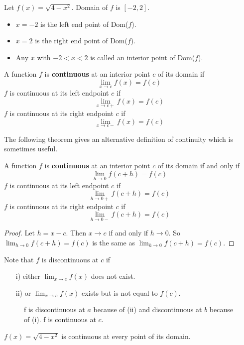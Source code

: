 \documentclass[../main.tex]{subfiles}
\begin{document}
	Let $f(x) = \sqrt{4 - x^2}$. Domain of $f$ is $[-2, 2]$.
	\begin{itemize}
		\item $x = -2$ is the left end point of Dom($f$).
		\item $x = 2$ is the right end point of Dom($f$).
		\item Any $x$ with $-2 < x < 2$ is called an interior point of Dom($f$).
	\end{itemize}

	\begin{definition}
		A function $f$ is \textbf{continuous} at an interior point $c$ of its domain if
		\[
			\lim_{x \to c} f(x) = f(c)
		\]
		$f$ is continuous at its left endpoint $c$ if
		\[
			\lim_{x \to c+} f(x) = f(c)
		\]
		$f$ is continuous at its right endpoint $c$ if
		\[
			\lim_{x \to c-} f(x) = f(c)
		\]
	\end{definition}

	The following theorem gives an alternative definition of continuity which is sometimes useful.
	\begin{theorem}\label{alternative continuity}
	A function $f$ is \textbf{continuous} at an interior point $c$ of its domain if and only if
	\[
		\lim_{h \to 0} f(c+h) = f(c)
	\]
	$f$ is continuous at its left endpoint $c$ if
	\[
		\lim_{h \to 0+} f(c+h) = f(c)
	\]
	$f$ is continuous at its right endpoint $c$ if
	\[
		\lim_{h \to 0-} f(c+h) = f(c)
	\]
\end{theorem}
\begin{proof}
	Let $h=x-c$. Then $x \to c$ if and only if $h \to 0$. So $\lim_{h \to 0} f(c+h) = f(c)$ is the same as $\lim_{h \to 0} f(c+h) = f(c)$.
\end{proof}
Note that $f$ is discontinuous at $c$ if
\begin{itemize}
	\item[i)] either $\lim_{x \to c} f(x)$ does not exist.
	\item[ii)] or $\lim_{x \to c} f(x)$ exists but is not equal to $f(c)$.
\end{itemize}

\begin{figure}[H]
	\centering
	
	\caption{f is discontinuous at $a$ because of (ii) and discontinuous at $b$ because of (i). f is continuous at $c$.}
\end{figure}

\begin{example}
	$f(x) = \sqrt{4 - x^2}$ is continuous at every point of its domain.
	\begin{figure}[H]
		\centering
		
	\end{figure}
\end{example}
\end{document}
